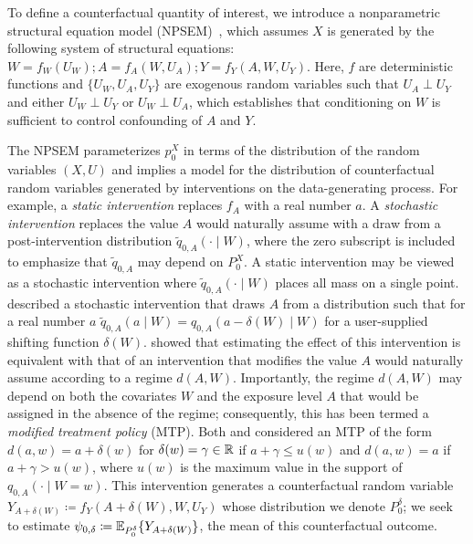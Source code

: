 To define a counterfactual quantity of interest, we introduce a nonparametric
structural equation model (NPSEM)~\citep{pearl2009causality}, which assumes $X$
is generated by the following system of structural equations: $ W = f_W(U_W);
A = f_A(W, U_A); Y = f_Y(A, W, U_Y)$. Here, $f$ are deterministic functions and
$\{U_W, U_A, U_Y\}$ are exogenous random variables such that $U_A \perp U_Y$ and
either $U_W \perp U_Y$ or $U_W \perp U_A$, which establishes that conditioning
on $W$ is sufficient to control confounding of $A$ and $Y$.

The NPSEM parameterizes $p_0^X$ in terms of the distribution of the random
variables $(X, U)$ and implies a model for the distribution of counterfactual
random variables generated by interventions on the data-generating process. For
example, a \textit{static intervention} replaces $f_A$ with a real number $a$.
A \textit{stochastic intervention} replaces the value $A$ would naturally assume
with a draw from a post-intervention distribution $\tilde{q}_{0,A}(\cdot \mid
W)$, where the zero subscript is included to emphasize that $\tilde{q}_{0,A}$
may depend on $P_0^X$. A static intervention may be viewed as a stochastic
intervention where $\tilde{q}_{0,A}(\cdot \mid W)$ places all mass on a single
point. \citet{diaz2012population} described a stochastic intervention that draws
$A$ from a distribution such that for a real number $a$ $\tilde{q}_{0,A}(a \mid
W) = q_{0,A}(a - \delta(W) \mid W)$ for a user-supplied shifting function
$\delta(W)$. \citet{haneuse2013estimation} showed that estimating the effect of
this intervention is equivalent with that of an intervention that modifies the
value $A$ would naturally assume according to a regime $d(A,W)$. Importantly,
the regime $d(A,W)$ may depend on both the covariates $W$ and the exposure level
$A$ that would be assigned in the absence of the regime; consequently, this has
been termed a \textit{modified treatment policy} (MTP). Both
\citet{haneuse2013estimation} and \citet{diaz2018stochastic} considered an MTP
of the form $d(a,w) = a + \delta(w)$ for $\delta(w) = \gamma \in \mathbb{R}$ if $a
+ \gamma \leq u(w)$ and $d(a,w) = a$ if $a + \gamma > u(w)$, where $u(w)$ is the
maximum value in the support of $q_{0,A}(\cdot \mid W = w)$. This intervention
generates a counterfactual random variable $Y_{A + \delta(W)} \coloneqq f_Y(A
+ \delta(W), W, U_Y)$ whose distribution we denote $P_0^{\delta}$; we seek to
estimate $\psi_{0, \delta} \coloneqq \mathbb{E}_{P_0^{\delta}} \{ Y_{A + \delta(W)} \}$,
the mean of this counterfactual outcome.

